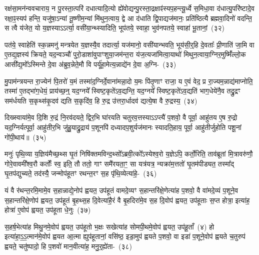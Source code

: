 रक्ष॑सा॒मन॑न्ववचाराय॒ न पु॒रस्ता॒त्परि॑ दधात्यादि॒त्यो ह्ये॑वोद्यन्पु॒रस्ता॒द्\-रक्षाꣴ॑स्यप॒हन्त्यू॒र्ध्वे स॒मिधा॒वा द॑धात्यु॒परि॑ष्टादे॒व रक्षा॒ꣴ॒स्यप॑ हन्ति॒ यजु॑षा॒\-ऽन्यां तू॒ष्णीम॒न्यां मि॑थुन॒त्वाय॒ द्वे आ द॑धाति द्वि॒पाद्यज॑मानः॒ प्रति॑ष्ठित्यै ब्रह्मवा॒दिनो॑ वदन्ति॒ स त्वै य॑जेत॒ यो य॒ज्ञस्या\-ऽऽ\-र्त्या॒ वसी॑या॒न्थ्स्यादिति॒ भूप॑तये॒ स्वाहा॒ भुव॑नपतये॒ स्वाहा॑ भू॒तानां॒~(३२)

पत॑ये॒ स्वाहेति॑ स्क॒न्नमनु॑ मन्त्रयेत य॒ज्ञस्यै॒व तदार्त्या॒ यज॑मानो॒ वसी॑यान्भवति॒ भूय॑सी॒र्॒\mbox{}हि दे॒वताः᳚ प्री॒णाति॑ जा॒मि वा ए॒तद्य॒ज्ञस्य॑ क्रियते॒ यद॒न्वञ्चौ॑ पुरो॒डाशा॑वुपाꣳशुया॒जम॑न्त॒रा य॑ज॒त्यजा॑मित्वा॒याथो॑ मिथुन॒त्वाया॒ग्निर॒मुष्मिँ॑ल्लो॒क आसी᳚द्य॒मो᳚\-ऽस्मिन्ते दे॒वा अ॑ब्रुव॒न्नेते॒मौ वि पर्यू॑हा॒मेत्य॒न्नाद्ये॑न दे॒वा अ॒ग्नि-~(३३)

मु॒पाम॑न्त्रयन्त रा॒ज्येन॑ पि॒तरो॑ य॒मं तस्मा॑द॒ग्निर्दे॒वाना॑मन्ना॒दो य॒मः पि॑तृ॒णाꣳ राजा॒ य ए॒वं वेद॒ प्र रा॒ज्यम॒न्नाद्य॑माप्नोति॒ तस्मा॑ ए॒तद्भा॑ग॒धेयं॒ प्राय॑च्छ॒न्॒ यद॒ग्नये᳚ स्विष्ट॒कृते॑\-ऽव॒द्यन्ति॒ यद॒ग्नये᳚ स्विष्ट॒कृते॑\-ऽव॒द्यति॑ भाग॒धेये॑नै॒व तद्रु॒द्रꣳ सम॑र्धयति स॒कृथ्स॑कृ॒दव॑ द्यति स॒कृदि॑व॒ हि रु॒द्र उ॑त्तरा॒र्धादव॑ द्यत्ये॒षा वै रु॒द्रस्य॒~(३४)

दिख्स्वाया॑मे॒व दि॒शि रु॒द्रं नि॒रव॑दयते॒ द्विर॒भि घा॑रयति चतुरव॒त्तस्या\-ऽऽ\-प्त्यै॑ प॒शवो॒ वै पूर्वा॒ आहु॑तय ए॒ष रु॒द्रो यद॒ग्निर्यत्पूर्वा॒ आहु॑तीर॒भि जु॑हु॒याद्रु॒द्राय॑ प॒शूनपि॑ दध्यादप॒शुर्यज॑मानः स्यादति॒हाय॒ पूर्वा॒ आहु॑तीर्जुहोति पशू॒नां गो॑पी॒थाय॑॥~(३५)

{}%

मनुः॑ पृथि॒व्या य॒ज्ञिय॑मैच्छ॒थ्स घृ॒तं निषि॑क्तमविन्द॒थ्सो᳚\-ऽब्रवी॒त्को᳚\-ऽस्येश्व॒रो य॒ज्ञे\-ऽपि॒ कर्तो॒रिति॒ ताव॑ब्रूतां मि॒त्रावरु॑णौ॒ गोरे॒वावमी᳚श्व॒रौ कर्तोः᳚ स्व॒ इति॒ तौ ततो॒ गाꣳ समै॑रयता॒ꣳ॒ सा यत्र॑यत्र॒ न्यक्रा॑म॒त्ततो॑ घृ॒तम॑पीड्यत॒ तस्मा᳚द् घृ॒तप॑द्युच्यते॒ तद॑स्यै॒ जन्मोप॑हूतꣳ रथन्त॒रꣳ स॒ह पृ॑थि॒व्येत्या॑हे॒-~(३६)

यं वै र॑थन्त॒रमि॒मामे॒व स॒हान्नाद्ये॒नोप॑ ह्वयत॒ उप॑हूतं वामदे॒व्यꣳ स॒हान्तरि॑क्षे॒णेत्या॑ह प॒शवो॒ वै वा॑मदे॒व्यं प॒शूने॒व स॒हान्तरि॑क्षे॒णोप॑ ह्वयत॒ उप॑हूतं बृ॒हथ्स॒ह दि॒वेत्या॑है॒रं वै बृ॒हदिरा॑मे॒व स॒ह दि॒वोप॑ ह्वयत॒ उप॑हूताः स॒प्त होत्रा॒ इत्या॑ह॒ होत्रा॑ ए॒वोप॑ ह्वयत॒ उप॑हूता धे॒नुः~(३७)

स॒हर्\mbox{}ष॒भेत्या॑ह मिथु॒नमे॒वोप॑ ह्वयत॒ उप॑हूतो भ॒क्षः सखेत्या॑ह सोमपी॒थमे॒वोप॑ ह्वयत॒ उप॑हू॒ताँ~(४) हो इत्या॑हा॒\-ऽ॒\-ऽ॒त्मान॑मे॒वोप॑ ह्वयत आ॒त्मा ह्युप॑हूतानां॒ वसि॑ष्ठ॒ इडा॒मुप॑ ह्वयते प॒शवो॒ वा इडा॑ प॒शूने॒वोप॑ ह्वयते च॒तुरुप॑ ह्वयते॒ चतु॑ष्पादो॒ हि प॒शवो॑ मान॒वीत्या॑ह॒ मनु॒र्॒\mbox{}ह्ये॑ता-~(३८)

